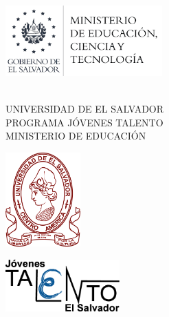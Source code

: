 \pagestyle{plain}
\begin{center}
\begin{flushleft}\hspace{55mm}
\includegraphics[height=2.7cm]{SILABO/LOGO 2020 MINED.png}
\end{flushleft}

\,\\

UNIVERSIDAD DE EL SALVADOR\\
    PROGRAMA JÓVENES TALENTO\\
    MINISTERIO DE EDUCACIÓN
\end{center}

\begin{flushleft}\vspace{-45mm}
\includegraphics[height=3.6cm]{SILABO/LOGO UES 2020.png}
\end{flushleft}

 
\begin{flushright}\vspace{-40mm}
\includegraphics[height=2cm]{SILABO/logo.png}
\end{flushright}
\,\\
\,\\

